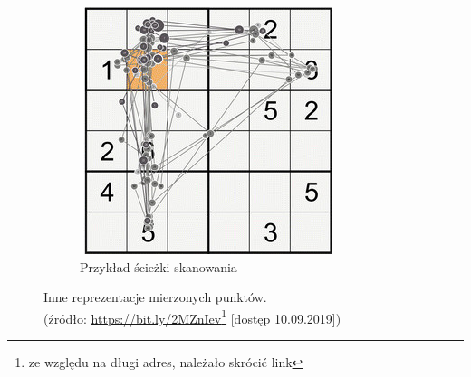 \begin{figure}[H]
\begin{subfigure}{.5\textwidth}
      \includegraphics[width=\linewidth]{resources/scanpaths.png}
      \caption{Przykład ścieżki skanowania}
      \label{fig:scanpaths}
    \end{subfigure}
    \caption[Inne reprezentacje mierzonych punktów]{Inne reprezentacje mierzonych punktów.\\\hspace{\textwidth}
    \small(źródło: \url{https://bit.ly/2MZnIev}\footnote{ze względu na długi adres, należało skrócić link} [dostęp 10.09.2019])}
    \label{fig:otherfigures}
\end{figure}